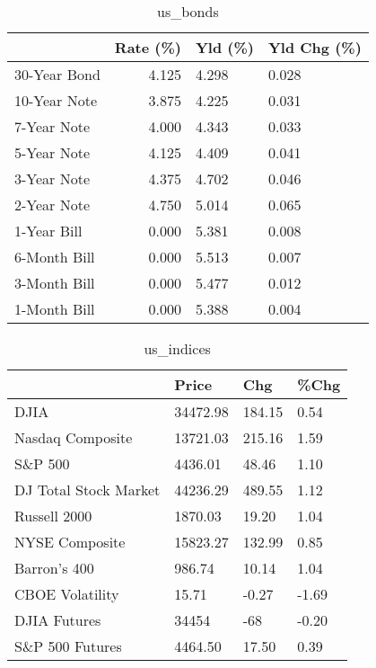 \documentclass{article}%
\begin{document}
%


\begin{table}[htbp]%
\caption{us\_bonds}%
\centering%
\begin{adjustbox}{width=1\textwidth}%
\begin{tabular}{lrll}
\toprule
             &  Rate (\%) & Yld (\%) & Yld Chg (\%) \\
\midrule
30-Year Bond &     4.125 &   4.298 &       0.028 \\
10-Year Note &     3.875 &   4.225 &       0.031 \\
 7-Year Note &     4.000 &   4.343 &       0.033 \\
 5-Year Note &     4.125 &   4.409 &       0.041 \\
 3-Year Note &     4.375 &   4.702 &       0.046 \\
 2-Year Note &     4.750 &   5.014 &       0.065 \\
 1-Year Bill &     0.000 &   5.381 &       0.008 \\
6-Month Bill &     0.000 &   5.513 &       0.007 \\
3-Month Bill &     0.000 &   5.477 &       0.012 \\
1-Month Bill &     0.000 &   5.388 &       0.004 \\
\bottomrule
\end{tabular}
%
\end{adjustbox}%
\end{table}

%


\begin{table}[htbp]%
\caption{us\_indices}%
\centering%
\begin{adjustbox}{width=1\textwidth}%
\begin{tabular}{llll}
\toprule
                      &    Price &    Chg &  \%Chg \\
\midrule
                 DJIA & 34472.98 & 184.15 &  0.54 \\
     Nasdaq Composite & 13721.03 & 215.16 &  1.59 \\
              S\&P 500 &  4436.01 &  48.46 &  1.10 \\
DJ Total Stock Market & 44236.29 & 489.55 &  1.12 \\
         Russell 2000 &  1870.03 &  19.20 &  1.04 \\
       NYSE Composite & 15823.27 & 132.99 &  0.85 \\
         Barron's 400 &   986.74 &  10.14 &  1.04 \\
      CBOE Volatility &    15.71 &  -0.27 & -1.69 \\
         DJIA Futures &    34454 &    -68 & -0.20 \\
      S\&P 500 Futures &  4464.50 &  17.50 &  0.39 \\
\bottomrule
\end{tabular}
%
\end{adjustbox}%
\end{table}
\end{document}
